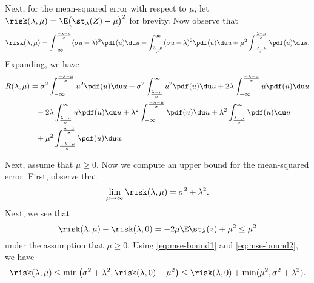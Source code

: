 
Next, for the mean-squared error with respect to \(\mu\), let \(\risk(\lambda, \mu) = \E \big(\st_\lambda(Z) - \mu\big)^2\) for brevity. Now observe that
\[
  \risk(\lambda, \mu) = \int_{-\infty}^\frac{-\lambda - \mu}{\sigma} (\sigma u + \lambda)^2 \pdf(u)\du u +
  \int_{\frac{\lambda - \mu}{\sigma}}^\infty (\sigma u - \lambda)^2 \pdf(u)\du u + \mu^2 \int_{\frac{-\lambda - \mu}{\sigma}}^{\frac{\lambda - \mu}{\sigma}} \pdf(u)\du u.
\]
Expanding, we have
\[
  \begin{aligned}
    R(\lambda,\mu) & = \sigma^2 \int_{-\infty}^\frac{-\lambda - \mu}{\sigma} u^2 \pdf(u)\du u + \sigma^2 \int_\frac{\lambda - \mu}{\sigma}^\infty u^2 \pdf(u)\du u + 2\lambda \int_{-\infty}^\frac{-\lambda - \mu}{\sigma} u \pdf(u)\du u \\
                   & \phantom{=} - 2\lambda \int_\frac{\lambda - \mu}{\sigma}^{\infty} u \pdf(u)\du u + \lambda^2 \int_{-\infty}^\frac{-\lambda-\mu}{\sigma} \pdf(u)\du u + \lambda^2 \int_\frac{\lambda-\mu}{\sigma}^\infty \pdf(u)\du u \\
                   & \phantom{=} + \mu^2 \int_\frac{-\lambda - \mu}{\sigma}^\frac{\lambda - \mu}{\sigma} \pdf(u) \du u.
  \end{aligned}
\]

Next, assume that \(\mu \geq 0\). Now we compute an upper bound for the mean-squared error. First, observe that
\begin{equation}
  \label{eq:mse-bound1}
  \lim_{\mu \rightarrow \infty} \risk(\lambda, \mu) = \sigma^2 + \lambda^2.
\end{equation}
Next, we see that
\begin{equation}
  \label{eq:mse-bound2}
  \risk(\lambda, \mu) - \risk(\lambda, 0) = -2\mu \E \st_\lambda(z) + \mu^2 \leq \mu^2
\end{equation}
under the assumption that \(\mu \geq 0\). Using \eqref{eq:mse-bound1} and \eqref{eq:mse-bound2}, we have
\[
  \risk(\lambda,\mu) \leq \min\big(\sigma^2 + \lambda^2, \risk(\lambda, 0) + \mu^2\big) \leq \risk(\lambda, 0) + \min(\mu^2, \sigma^2 + \lambda^2).
\]


